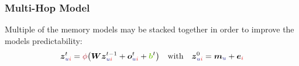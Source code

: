 \subsubsection*{Multi-Hop Model}
\label{subsubsubsec:multi-hop}
Multiple of the memory models may be stacked together in order to improve the models predictability:
\begin{align}
  \vec{z}_{\idxu\idxi}^{t}=\phic\big(\vec{W}\vec{z}_{\idxu\idxi}^{t-1}+\vec{o}_{\idxu\idxi}^{t}
  +\vec{\mcb}^{t}\big)&&\text{with}&&\vec{z}_{\idxu\idxi}^{0}=\vec{m}_{\idxu}+\vec{e}_{\idxi}
\end{align}


